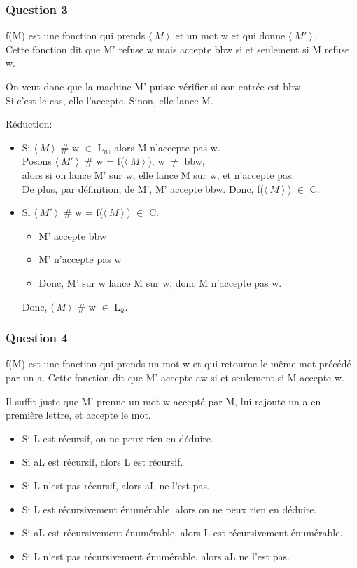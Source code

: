 \subsubsection{Question 3}

f(M) est une fonction qui prends $\langle\ M\ \rangle \!\ $ et un mot w et qui donne $\langle\ M'\ \rangle \!\ $.\\
Cette fonction dit que  M' refuse w mais accepte bbw si et seulement si M refuse w.

On veut donc que la machine M' puisse vérifier si son entrée est bbw.\\
Si c'est le cas, elle l'accepte. Sinon, elle lance M.

Réduction:
\begin{itemize}
  \item Si $\langle\ M\ \rangle \!\ $ \# w $\in$ L$_{\bar{u}}$, alors M n'accepte pas w.\\
  Posons $\langle\ M'\ \rangle \!\ $ \# w = f($\langle\ M\ \rangle \!\ $), w $\neq$ bbw,\\
  alors si on lance M' sur w, elle lance M sur w, et n'accepte pas.\\
  De plus, par définition, de M', M' accepte bbw. Donc, f($\langle\ M\ \rangle \!\ $) $\in$ C.
  \item Si $\langle\ M'\ \rangle \!\ $ \# w = f($\langle\ M\ \rangle \!\ $) $\in$ C.
  \begin{itemize}
    \item M' accepte bbw
    \item M' n'accepte pas w
    \item Donc, M' sur w lance M sur w, donc M n'accepte pas w.
  \end{itemize}
  Donc, $\langle\ M\ \rangle \!\ $ \# w $\in$ L$_{\bar{u}}$.
\end{itemize}


\subsubsection{Question 4}

f(M) est une fonction qui prends un mot w et qui retourne le même mot précédé par un a.
Cette fonction dit que M' accepte aw si et seulement si M accepte w.

Il suffit juste que M' prenne un mot w accepté par M, lui rajoute un a en première lettre, et accepte le mot.

\begin{itemize}
  \item Si L est récursif, on ne peux rien en déduire.
  \item Si aL est récursif, alors L est récursif.
  \item Si L n'est pas récursif, alors aL ne l'est pas.
  \item Si L est récursivement énumérable, alors on ne peux rien en déduire.
  \item Si aL est récursivement énumérable, alors L est récursivement énumérable.
  \item Si L n'est pas récursivement énumérable, alors aL ne l'est pas.
\end{itemize}

